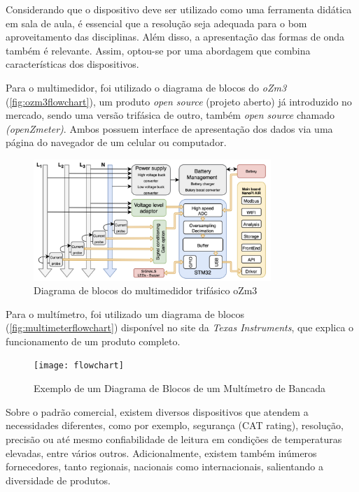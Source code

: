 Considerando que o dispositivo deve ser utilizado como uma ferramenta didática em sala de aula, é essencial que a resolução seja adequada para o bom aproveitamento das disciplinas. Além disso, a apresentação das formas de onda também é relevante. Assim, optou-se por uma abordagem que combina características dos dispositivos.

Para o multimedidor, foi utilizado o diagrama de blocos do \textit{oZm3} (\autoref{fig:ozm3flowchart}), um produto \textit{open source} (projeto aberto) já introduzido no mercado, sendo uma versão trifásica de outro, também \textit{open source} chamado \textit{(openZmeter)}. Ambos possuem interface de apresentação dos dados via uma página do navegador de um celular ou computador.

\begin{figure}[htb!]
    \caption{Diagrama de blocos do multimedidor trifásico oZm3}
    \label{fig:ozm3flowchart}
    \includegraphics[width=0.8\textwidth]{figuras/openzmeter-diagrama.png}
\end{figure}

Para o multímetro, foi utilizado um diagrama de blocos (\autoref{fig:multimeterflowchart}) disponível no site da \textit{Texas Instruments}, que explica o funcionamento de um produto completo.

\begin{figure}[htb!]%
    \caption{Exemplo de um Diagrama de Blocos de um Multímetro de Bancada}%
    \label{fig:multimeterflowchart}%
    \texttt{[image: flowchart]}%
\end{figure}

Sobre o padrão comercial, existem diversos dispositivos que atendem a necessidades diferentes, como por exemplo, segurança (CAT rating), resolução, precisão ou até mesmo confiabilidade de leitura em condições de temperaturas elevadas, entre vários outros. Adicionalmente, existem também inúmeros fornecedores, tanto regionais, nacionais como internacionais, salientando a diversidade de produtos.

